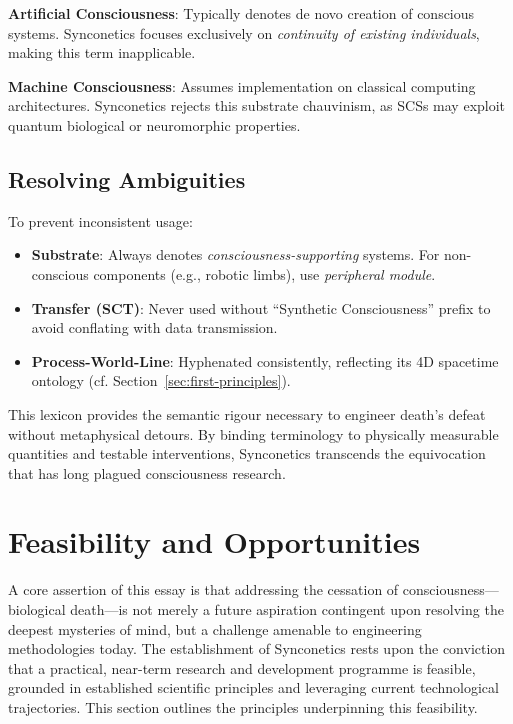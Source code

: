 \documentclass[10pt]{article}
\begin{document}
\begin{sloppypar}
  \textbf{Artificial Consciousness}: Typically denotes de novo creation of conscious systems. Synconetics focuses exclusively on \textit{continuity of existing individuals}, making this term inapplicable.

  \textbf{Machine Consciousness}: Assumes implementation on classical computing architectures. Synconetics rejects this substrate chauvinism, as SCSs may exploit quantum biological or neuromorphic properties.

  \subsection{Resolving Ambiguities}
  To prevent inconsistent usage:
  \begin{itemize}
    \item \textbf{Substrate}: Always denotes \textit{consciousness-supporting} systems. For non-conscious components (e.g., robotic limbs), use \textit{peripheral module}.
    \item \textbf{Transfer (SCT)}: Never used without “Synthetic Consciousness” prefix to avoid conflating with data transmission.
    \item \textbf{Process-World-Line}: Hyphenated consistently, reflecting its 4D spacetime ontology (cf. Section~\ref{sec:first-principles}).
  \end{itemize}

  This lexicon provides the semantic rigour necessary to engineer death’s defeat without metaphysical detours. By binding terminology to physically measurable quantities and testable interventions, Synconetics transcends the equivocation that has long plagued consciousness research.


  \section{Feasibility and Opportunities}
  \label{sec:feasibility}

  A core assertion of this essay is that addressing the cessation of consciousness—biological death—is not merely a future aspiration contingent upon resolving the deepest mysteries of mind, but a challenge amenable to engineering methodologies today. The establishment of Synconetics rests upon the conviction that a practical, near-term research and development programme is feasible, grounded in established scientific principles and leveraging current technological trajectories. This section outlines the principles underpinning this feasibility.


\end{sloppypar}
\end{document}
